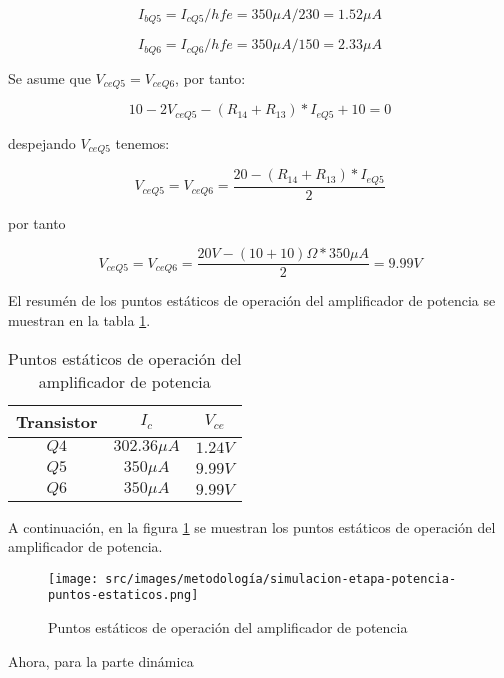 $$I_{bQ5} = I_{cQ5} / hfe = 350\mu A / 230 = 1.52 \mu A $$

$$I_{bQ6} = I_{cQ6} / hfe = 350\mu A / 150 = 2.33 \mu A $$

Se asume que $V_{ceQ5} = V_{ceQ6} $, por tanto:

$$ 10 - 2 V_{ceQ5} - (R_{14} + R_{13}) * I_{eQ5} + 10 = 0$$

despejando $V_{ceQ5}$ tenemos:

\begin{equation}
    V_{ceQ5} = V_{ceQ6} = \frac{ 20 - (R_{14} + R_{13}) * I_{eQ5} }{2}
\end{equation}

por tanto 

$$ V_{ceQ5} = V_{ceQ6} = \frac{ 20 V - (10 + 10) \Omega * 350\mu A }{2} = 9.99 V$$

El resumén de los puntos estáticos de operación del amplificador de potencia se muestran en la tabla \ref{tab:amplificador-de-potencia-puntos-estaticos}.

\begin{table}[ht]
    \centering
    \begin{tabular}{|c|c|c|}
        \hline
        Transistor & \textbf{$I_c$} & \textbf{$V_{ce}$} \\
        \hline
        $Q4$ & $302.36 \mu A$ & $1.24 V$ \\
        $Q5$ & $350\mu A$ & $9.99 V$ \\
        $Q6$ & $350\mu A$ & $9.99 V$ \\
        \hline
    \end{tabular}
    \caption{Puntos estáticos de operación del amplificador de potencia}
    \label{tab:amplificador-de-potencia-puntos-estaticos}
\end{table}

A continuación, en la figura \ref{fig:met-puntos-estaticos-amplificador-de-potencia} se muestran los puntos estáticos de operación del amplificador de potencia.

\begin{figure}[ht]
    \centering
    \texttt{[image: src/images/metodología/simulacion-etapa-potencia-puntos-estaticos.png]}
    \caption{Puntos estáticos de operación del amplificador de potencia}
    \label{fig:met-puntos-estaticos-amplificador-de-potencia}
\end{figure}

Ahora, para la parte dinámica